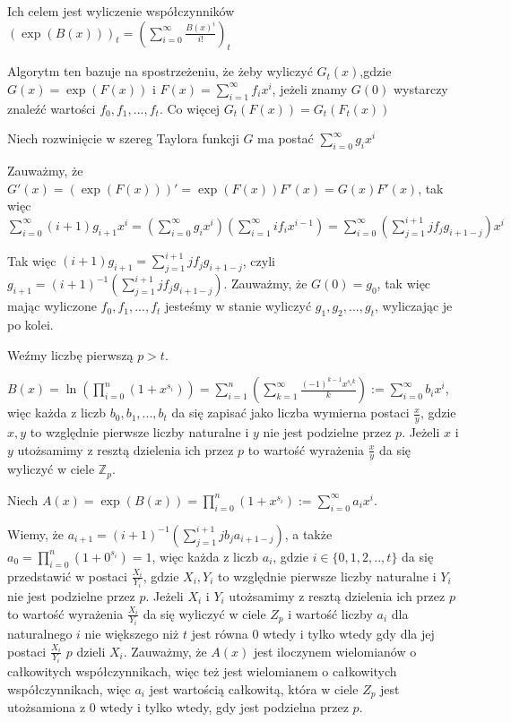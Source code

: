 \documentclass{article}
\begin{document}
Ich celem jest wyliczenie współczynników $(\exp(B(x)))_t=(\sum_{i=0}^\infty \frac{B(x)^i}{i!})_t$

Algorytm ten bazuje na spostrzeżeniu, że żeby wyliczyć $G_t(x)$,gdzie $G(x)=\exp(F(x))$ i $F(x) =\sum_{i=1}^\infty f_ix^i$,
jeżeli znamy $G(0)$ wystarczy znaleźć wartości $f_0,f_1,...,f_t$. Co więcej $G_t(F(x))=G_t(F_t(x))$

Niech rozwinięcie w szereg Taylora funkcji $G$ ma postać $\sum^{\infty}_{i=0}g_ix^i$

Zauważmy, że $G'(x)=(\exp(F(x)))'=\exp(F(x))F'(x)=G(x)F'(x)$, tak więc
$\sum_{i=0}^{\infty}(i+1)g_{i+1}x^{i}=(\sum_{i=0}^{\infty}g_ix^i)(\sum_{i=1}^{\infty}if_{i}x^{i-1})=
\sum_{i=0}^{\infty}(\sum_{j=1}^{i+1}jf_jg_{i+1-j})x^i$

Tak więc $(i+1)g_{i+1}=\sum_{j=1}^{i+1}jf_jg_{i+1-j}$, czyli $g_{i+1}=(i+1)^{-1}(\sum_{j=1}^{i+1}jf_jg_{i+1-j})$.
Zauważmy, że $G(0)=g_0$, tak więc mając wyliczone $f_0,f_1,...,f_t$ jesteśmy w stanie wyliczyć $g_1,g_2,...,g_t$, wyliczając je po kolei.

Weźmy liczbę pierwszą $p>t$.

$B(x)=\ln(\prod_{i=0}^n(1+x^{s_i}))=\sum_{i=1}^{n}(\sum_{k=1}^{\infty}\frac{(-1)^{k-1}x^{s_ik}}{k}):=\sum_{i=0}^{\infty}b_ix^i$, 
więc każda z liczb $b_0,b_1,...,b_t$ da się zapisać jako liczba wymierna postaci $\frac{x}{y}$, gdzie $x,y$ to
względnie pierwsze liczby naturalne i $y$ nie jest podzielne przez $p$. Jeżeli $x$ i $y$ utożsamimy z resztą dzielenia ich 
przez $p$ to wartość wyrażenia $\frac{x}{y}$ da się wyliczyć w ciele $\mathbb{Z}_p$.

Niech $A(x)=\exp(B(x))=\prod_{i=0}^n(1+x^{s_i}):=\sum_{i=0}^{\infty}a_ix^i$.

Wiemy, że $a_{i+1}=(i+1)^{-1}(\sum_{j=1}^{i+1}jb_ja_{i+1-j})$, a także $a_0=\prod_{i=0}^n(1+0^{s_i})=1$, więc każda
z liczb $a_i$, gdzie $i \in \{0,1,2,..,t \}$ da się przedstawić w postaci $\frac{X_i}{Y_i}$, gdzie $X_i,Y_i$ to
względnie pierwsze liczby naturalne i $Y_i$ nie jest podzielne przez $p$. Jeżeli $X_i$ i $Y_i$ utożsamimy z resztą dzielenia ich 
przez $p$ to wartość wyrażenia $\frac{X_i}{Y_i}$ da się wyliczyć w ciele $Z_p$ i wartość liczby $a_i$ dla naturalnego $i$
nie większego niż $t$ jest równa $0$ wtedy i tylko wtedy gdy dla jej postaci $\frac{X_i}{Y_i}$ $p$ dzieli $X_i$. Zauważmy,
że $A(x)$ jest iloczynem wielomianów o całkowitych współczynnikach, więc też jest wielomianem o całkowitych współczynnikach,
więc $a_i$ jest wartością całkowitą, która w ciele $Z_p$ jest utożsamiona z $0$ wtedy i tylko wtedy, gdy jest podzielna przez $p$.
\end{document}
